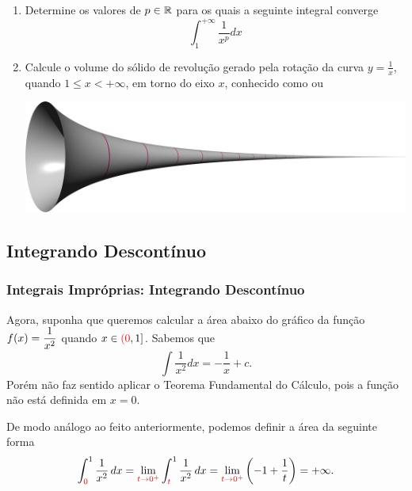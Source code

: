 \begin{frame}[label=improprias]
\begin{casa}
 \begin{enumerate}
 \item Determine os valores de $p\in \mathbb{R}$ para os quais a seguinte integral converge
 \[\int_1^{+\infty}\frac{1}{x^p}dx\]
 
 
 \item Calcule o volume do sólido de revolução gerado pela rotação da curva $y=\frac{1}{x}$, quando $1\leq x<+\infty$, em torno do eixo $x$, conhecido como  ou 
 
 
 \begin{center}
 \includegraphics[scale=0.1]{GabrielHorn}
 \end{center}

 \end{enumerate} 
\end{casa}
\end{frame}




\subsection*{Integrando Descontínuo}
\begin{frame}
\frametitle{Integrais Impróprias: Integrando Descontínuo}
% 

Agora, suponha que queremos calcular a área abaixo do gráfico da função $\displaystyle f(x)=\frac{1}{x^2}$ quando $x\in{\color{red}(0},1]$. Sabemos que 
 \[\int\frac{1}{x^2}dx=-\frac{1}{x}+c. \]
 Porém não faz sentido aplicar o Teorema Fundamental do Cálculo, pois a função não está definida em {\color{red}$x=0$}.
\bigskip

De modo análogo ao feito anteriormente, podemos definir a área da seguinte forma
\[\int_{{\color{red}0}}^{1}\frac{1}{x^2}\,dx=\lim_{{\color{red}t\to 0^+}}\int_{{\color{red}t}}^1\frac{1}{x^2}\,dx=\lim_{{\color{red}t\to 0^+}}\left(-1+\frac{1}{t}\right)=+\infty.\]



% 
\end{frame}





